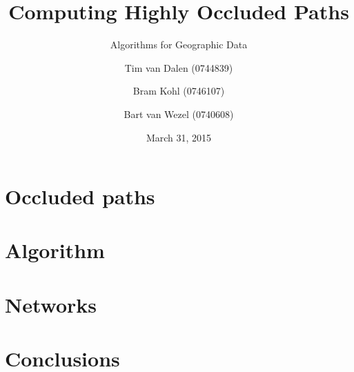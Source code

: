\documentclass[english,aspectratio=43]{beamer}
\title{Computing Highly Occluded Paths}
\subtitle{Algorithms for Geographic Data}
\author[Group 10]{
	Tim van Dalen (0744839)
	\and
	Bram Kohl (0746107)\\
	\and
	Bart van Wezel (0740608)
}
\institute[TU/e]
{
    WIS\\
	Eindhoven University of Technology
}
\date{March 31, 2015}
\begin{document}
	\begin{frame}
		\titlepage
	\end{frame}

	\section{Occluded paths}
	

	\section{Algorithm}
	

	\section{Networks}
	

	\section{Conclusions}
	

	\begin{frame}{}
	\end{frame}
\end{document}
